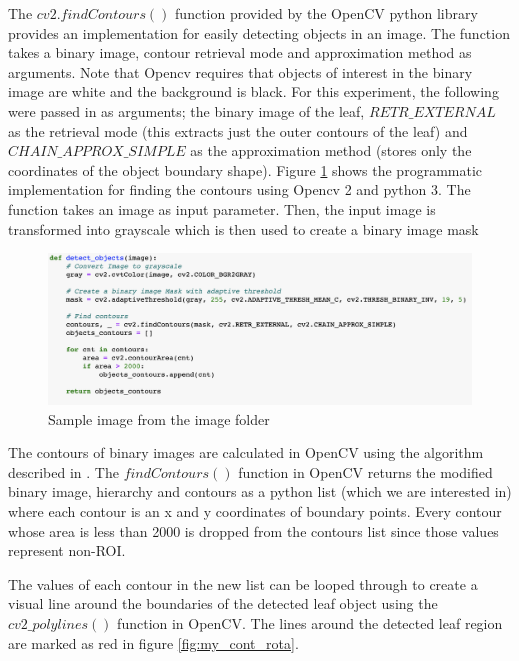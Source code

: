 The $cv2.findContours()$ function provided by the OpenCV python library provides an implementation for easily detecting objects in an image. The function takes a binary image, contour retrieval mode and approximation method as arguments. Note that Opencv requires that objects of interest in the binary image are white and the background is black. For this experiment, the following were passed in as arguments; the binary image of the leaf, $RETR\_EXTERNAL$ as the retrieval mode (this extracts just the outer contours of the leaf) and $CHAIN\_APPROX\_SIMPLE$ as the approximation method (stores only the coordinates of the object boundary shape). Figure \ref{fig:my_detect_obj} shows the programmatic implementation for finding the contours using Opencv 2 and python 3.
The function takes an image as input parameter. Then, the input image is transformed into grayscale which is then used to create a binary image mask 
\begin{figure}[!htb]
    \centering
    \includegraphics[scale=0.53, keepaspectratio]{Figures/Screenshot 2022-02-15 at 23.21.01.png}
    \caption{Sample image from the image folder}
    \label{fig:my_detect_obj}
\end{figure} 

The contours of binary images are calculated in OpenCV using the algorithm described in \cite{whyna}. The $findContours()$ function in OpenCV returns the modified binary image, hierarchy and contours as a python list (which we are interested in) where each contour is an x and y coordinates of boundary points. 
Every contour whose area is less than 2000 is dropped from the contours list since those values represent non-ROI.


The values of each contour in the new list can be looped through to create a visual line around the boundaries of the detected leaf object using the $cv2\_polylines()$ function in OpenCV. The lines around the detected leaf region are marked as red in figure \ref{fig:my_cont_rota}. 

